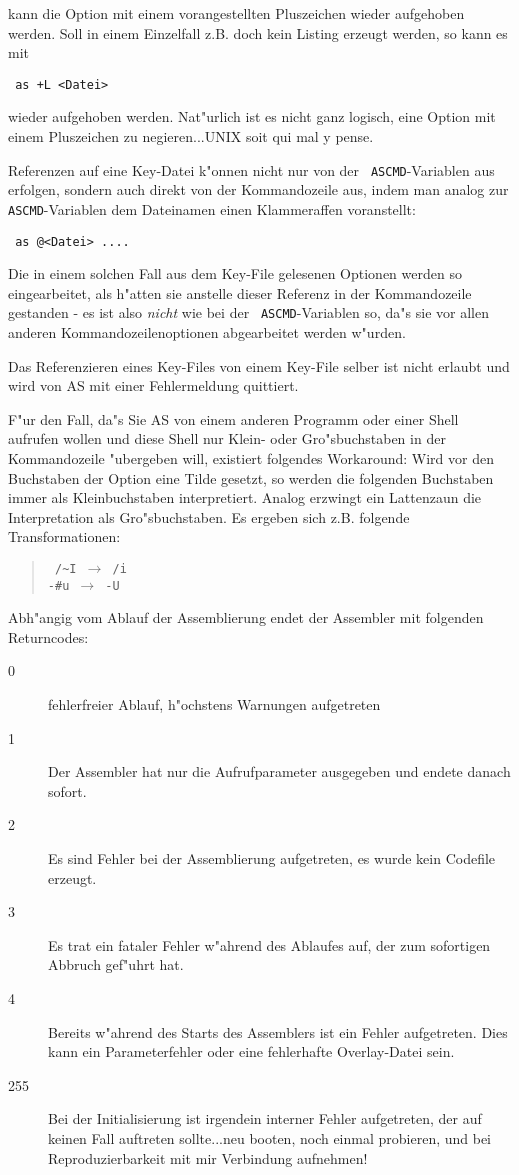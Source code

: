 \documentclass[12pt,a4paper,twoside]{report}
\begin{document}
kann die Option mit einem vorangestellten Pluszeichen wieder aufgehoben
werden.  Soll in einem Einzelfall z.B. doch kein Listing erzeugt werden,
so kann es mit
\begin{verbatim}
 as +L <Datei>
\end{verbatim}
wieder aufgehoben werden.  Nat"urlich ist es nicht ganz logisch, eine
Option mit einem Pluszeichen zu negieren...UNIX soit qui mal y pense.
\par
Referenzen auf eine Key-Datei k"onnen nicht nur von der {\tt
ASCMD}-Variablen aus erfolgen, sondern auch direkt von der Kommandozeile
aus, indem man analog zur {\tt ASCMD}-Variablen dem Dateinamen einen
Klammeraffen voranstellt:
\begin{verbatim}
 as @<Datei> ....
\end{verbatim}
Die in einem solchen Fall aus dem Key-File gelesenen Optionen werden so
eingearbeitet, als h"atten sie anstelle dieser Referenz in der
Kommandozeile gestanden - es ist also {\em nicht} wie bei der {\tt
ASCMD}-Variablen so, da"s sie vor allen anderen Kommandozeilenoptionen
abgearbeitet werden w"urden.
\par
Das Referenzieren eines Key-Files von einem Key-File selber ist nicht
erlaubt und wird von AS mit einer Fehlermeldung quittiert.
\par
F"ur den Fall, da"s Sie AS von einem anderen Programm oder einer Shell
aufrufen wollen und diese Shell nur Klein- oder Gro"sbuchstaben in der
Kommandozeile "ubergeben will, existiert folgendes Workaround: Wird vor
den Buchstaben der Option eine Tilde gesetzt, so werden die folgenden
Buchstaben immer als Kleinbuchstaben interpretiert.  Analog erzwingt
ein Lattenzaun die Interpretation als Gro"sbuchstaben.  Es ergeben
sich z.B. folgende Transformationen:
\begin{quote}{\tt
 /\verb!~!I $\longrightarrow$ /i \\
 -\verb!#!u $\longrightarrow$ -U}
\end{quote}
\par
Abh"angig vom Ablauf der Assemblierung endet der Assembler mit
folgenden Returncodes:
\begin{description}
\item[0]{fehlerfreier Ablauf, h"ochstens Warnungen aufgetreten}
\item[1]{Der Assembler hat nur die Aufrufparameter ausgegeben und
         endete danach sofort.}
\item[2]{Es sind Fehler bei der Assemblierung aufgetreten, es wurde
         kein Codefile erzeugt.}
\item[3]{Es trat ein fataler Fehler w"ahrend des Ablaufes auf, der
         zum sofortigen Abbruch gef"uhrt hat.}
\item[4]{Bereits w"ahrend des Starts des Assemblers ist ein Fehler
         aufgetreten.  Dies kann ein Parameterfehler oder eine fehlerhafte
         Overlay-Datei sein.}
\item[255]{Bei der Initialisierung ist irgendein interner Fehler
         aufgetreten, der auf keinen Fall auftreten sollte...neu booten,
         noch einmal probieren, und bei Reproduzierbarkeit mit mir
         Verbindung aufnehmen!}
\end{description}
\end{document}
